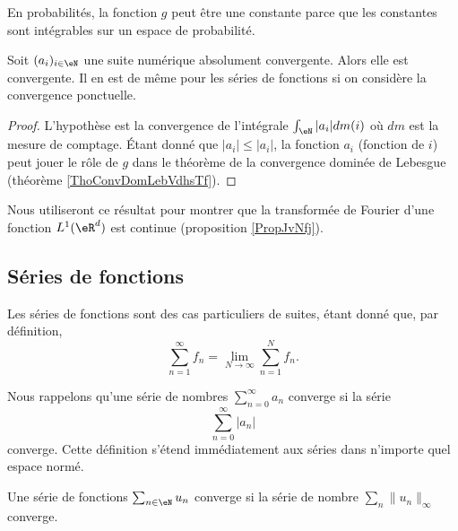 \begin{remark}
    En probabilités, la fonction \( g\) peut être une constante parce que les constantes sont intégrables sur un espace de probabilité.
\end{remark}

\begin{corollary}       \label{CorCvAbsNormwEZdRc}
    Soit \( (a_i)_{i\in \eN}\) une suite numérique absolument convergente. Alors elle est convergente. Il en est de même pour les séries de fonctions si on considère la convergence ponctuelle.
\end{corollary}

\begin{proof}
    L'hypothèse est la convergence de l'intégrale \( \int_{\eN}| a_i |dm(i)\) où \( dm\) est la mesure de comptage. Étant donné que \( | a_i |\leq | a_i |\), la fonction \( a_i\) (fonction de \( i\)) peut jouer le rôle de \( g\) dans le théorème de la convergence dominée de Lebesgue (théorème \ref{ThoConvDomLebVdhsTf}).
\end{proof}
Nous utiliseront ce résultat pour montrer que la transformée de Fourier d'une fonction \( L^1(\eR^d)\) est continue (proposition \ref{PropJvNfj}).

\subsection{Séries de fonctions}

Les séries de fonctions sont des cas particuliers de suites, étant donné que, par définition,
\begin{equation}
    \sum_{n=1}^{\infty}f_n=\lim_{N\to \infty} \sum_{n=1}^{N}f_n.
\end{equation}

Nous rappelons qu'une série de nombres \( \sum_{n=0}^{\infty}a_n\) converge  si la série
\begin{equation}
    \sum_{n=0}^{\infty}| a_n |
\end{equation}
converge. Cette définition s'étend immédiatement aux séries dans n'importe quel espace normé.

Une série de fonctions \( \sum_{n\in \eN}u_n \) converge  si la série de nombre \( \sum_n\| u_n \|_{\infty}\) converge.

